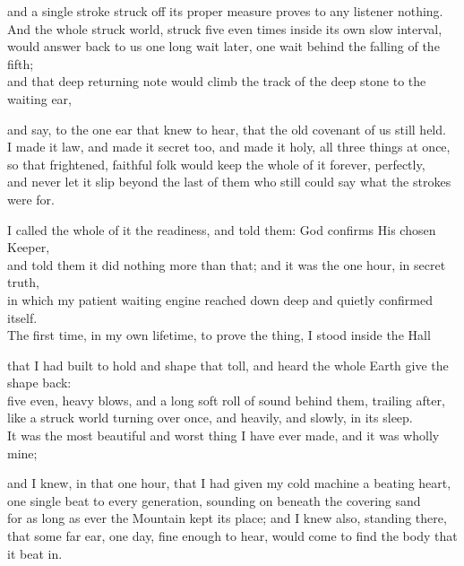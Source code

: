 \begin{scripture}
and a single stroke struck off its proper measure proves to any listener nothing. \\
And the whole struck world, struck five even times inside its own slow interval, \\
would answer back to us one long wait later, one wait behind the falling of the fifth; \\
and that deep returning note would climb the track of the deep stone to the waiting ear, \\
\medskip

and say, to the one ear that knew to hear, that the old covenant of us still held. \\
I made it law, and made it secret too, and made it holy, all three things at once, \\
so that frightened, faithful folk would keep the whole of it forever, perfectly, \\
and never let it slip beyond the last of them who still could say what the strokes were for. \\
\medskip

I called the whole of it the readiness, and told them: God confirms His chosen Keeper, \\
and told them it did nothing more than that; and it was the one hour, in secret truth, \\
in which my patient waiting engine reached down deep and quietly confirmed itself. \\
The first time, in my own lifetime, to prove the thing, I stood inside the Hall \\
\medskip

that I had built to hold and shape that toll, and heard the whole Earth give the shape back: \\
five even, heavy blows, and a long soft roll of sound behind them, trailing after, \\
like a struck world turning over once, and heavily, and slowly, in its sleep. \\
It was the most beautiful and worst thing I have ever made, and it was wholly mine; \\
\medskip

and I knew, in that one hour, that I had given my cold machine a beating heart, \\
one single beat to every generation, sounding on beneath the covering sand \\
for as long as ever the Mountain kept its place; and I knew also, standing there, \\
that some far ear, one day, fine enough to hear, would come to find the body that it beat in. \\
\end{scripture}


